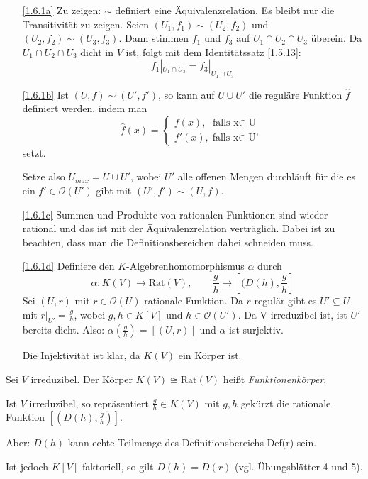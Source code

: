 \documentclass[a4paper,12pt]{scrbook}
\makeatletter
\theoremstyle{blah}
\theoremstyle{stz}
\renewcommand{\proofname}{Beweis}
\renewenvironment{proof}[1][\proofname]{\par
  \pushQED{\qed}%
  \normalfont \topsep6\p@\@plus6\p@\relax
  \trivlist
  \item[\hskip\labelsep
        \itshape
    #1\@addpunct{:}]\ignorespaces
}{%
  \popQED\endtrivlist\@endpefalse
}
\def\O{\mathcal{O}}
\newcommand{\Rat}{\mathrm{Rat}}
\newcommand{\ra}{\longrightarrow}
\newcommand{\restrict}[1]{|_{#1}}
\renewcommand{\mapsto}{\longmapsto}
\newcommand{\dach}{\widehat}
\makeatother
\begin{document}
\begin{proof}
\begin{enumerate}
\item[\ref{1.6.1a}] Zu zeigen: $\sim$ definiert eine Äquivalenzrelation. Es bleibt nur die Transitivität zu zeigen.
Seien $(U_1,f_1)\sim (U_2,f_2)$ und $(U_2,f_2)\sim (U_3,f_3)$. Dann stimmen $f_1$ und $f_3$ auf $U_1\cap U_2\cap U_3$ überein. Da $U_1\cap U_2\cap U_3$ dicht in $V$ ist, folgt mit dem Identitätssatz \autoref{1.5.13}:
\[f_1\restrict{U_1\cap U_3}=f_3\restrict{U_1\cap U_3}\]
\item[\ref{1.6.1b}] Ist $(U,f)\sim(U',f')$, so kann auf $U\cup U'$ die reguläre Funktion $\dach{f}$ definiert werden, indem man 
\[\dach{f}(x)=\begin{cases} f(x),\text{ falls x$\in$ U} \\ f'(x),\text{falls x$\in$ U'}\end{cases}\] setzt.

Setze also $U_{max}=U\cup U'$, wobei $U'$ alle offenen Mengen durchläuft für die es ein $f'\in \O(U')$ gibt mit $(U',f')\sim (U,f)$.
\item[\ref{1.6.1c}] Summen und Produkte von rationalen Funktionen sind wieder rational und das ist mit der Äquivalenzrelation verträglich. Dabei ist zu beachten, dass man die Definitionsbereichen dabei schneiden muss.
\item[\ref{1.6.1d}] Definiere den $K$-Algebrenhomomorphismus $\alpha$ durch
\[\alpha\colon K(V)\ra \Rat(V), \qquad \frac{g}{h}\mapsto [(D(h),\frac{g}{h}]\] 
Sei $(U,r)$ mit $r\in \O(U)$ rationale Funktion. Da $r$ regulär gibt es $U'\subseteq U$ mit $r\restrict{U'}=\frac{g}{h}$, wobei $g,h \in K[V]$ und $h\in \O(U')$. Da V irreduzibel ist, ist $U'$ bereits dicht. Also: $\alpha(\frac{g}{h})=[(U,r)]$ und $\alpha$ ist surjektiv.

Die Injektivität ist klar, da $K(V)$ ein Körper ist.
\end{enumerate}
\end{proof}

\begin{dfn}\label{1.6.2}
Sei $V$ irreduzibel. Der Körper $K(V)\cong \Rat(V)$ heißt \emph{Funktionenkörper}.
\end{dfn}

\begin{w}
Ist $V$ irreduzibel, so repräsentiert $\frac{g}{h} \in K(V)$ mit $g,h$ gekürzt die rationale Funktion $[(D(h),\frac{g}{h})]$.

Aber: $D(h)$ kann echte Teilmenge des Definitionsbereichs Def(r) sein. 

Ist jedoch $K[V]$ faktoriell, so gilt $D(h)=D(r)$ (vgl. Übungsblätter 4 und 5).
\end{w}
\end{document}
